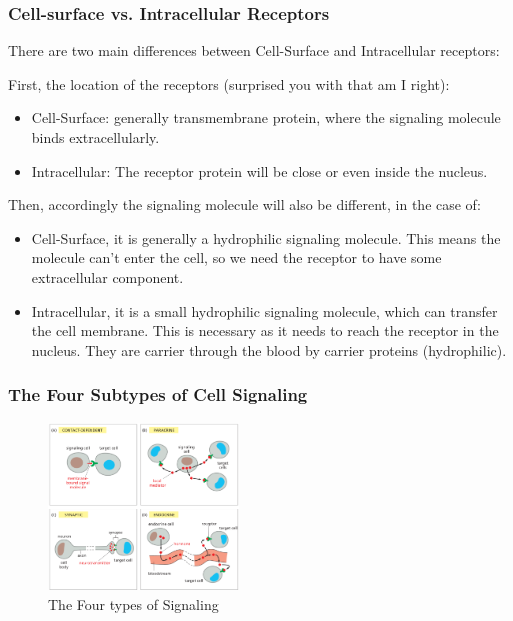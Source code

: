 \documentclass[../main.tex]{subfiles}
\begin{document}
\subsubsection{Cell-surface vs. Intracellular Receptors}

There are two main differences between Cell-Surface and Intracellular receptors:

First, the location of the receptors (surprised you with that am I right):
\begin{itemize}
	\item Cell-Surface: generally transmembrane protein, where the signaling molecule binds extracellularly.
	\item Intracellular: The receptor protein will be close or even inside the nucleus.
\end{itemize}

Then, accordingly the signaling molecule will also be different, in the case of:
\begin{itemize}
	\item Cell-Surface, it is generally a hydrophilic signaling molecule. This means the molecule can't enter the cell, so we need the receptor to have some extracellular component.
	\item Intracellular, it is a small hydrophilic signaling molecule, which can transfer the cell membrane. This is necessary as it needs to reach the receptor in the nucleus. They are carrier through the blood by carrier proteins (hydrophilic).
\end{itemize}


\subsubsection{The Four Subtypes of Cell Signaling}

\begin{figure}[H]
	\centering
	\includegraphics[width=0.45\textwidth]{4_horsemen}
	\caption{The Four types of Signaling}
\end{figure}
\end{document}
